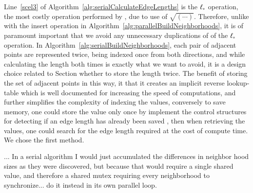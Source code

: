 Line~\ref{scel3} of Algorithm~\ref{alg:serialCalculateEdgeLengths} is the $\ell_\ast$ operation, the most costly operation performed by , due to use of $\sqrt{(\cdots)}$. Therefore, unlike with the insert operation in Algorithm~\ref{alg:parallelBuildNeighborhoods}, it is of paramount important that we avoid any unnecessary duplications of of the $\ell_\ast$ operation. In Algorithm~\ref{alg:serialBuildNeighborhoods}, each pair of adjacent points are represented twice, being indexed once from both directions, and while calculating the length both times is exactly what we want to avoid, it is a design choice related to Section whether to store the length twice. The benefit of storing the set of adjacent points in this way, it that it creates an implicit reverse lookup-table which is well documented for increasing the speed of computations, and further simplifies the complexity of indexing the values, conversely to save memory, one could store the value only once by implement the control structures for detecting if an edge length has already been saved , then when retrieving the values, one could search for the edge length required at the cost of compute time. We chose the first method.

...
In a serial algorithm I would just accumulated the differences in neighbor hood sizes as they were discovered, but because that would require a single shared value, and therefore a shared mutex requiring every neighborhood to synchronize... do it instead in its own parallel loop.


